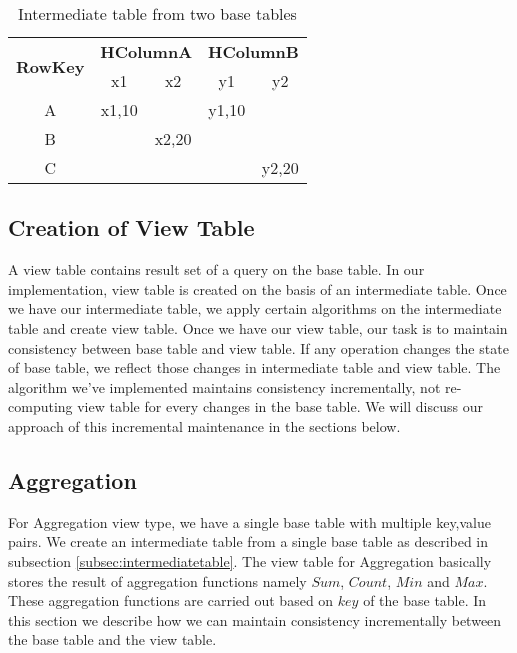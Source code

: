 \documentclass[11pt,a4paper,bibtotoc,idxtotoc,headsepline,footsepline,footexclude,BCOR12mm,DIV13]{scrbook}
\begin{document}
\begin{table*}[htb!]
	\centering
	\begin{tabular}{|c|c|c|c|c|}
		\hline
		\multirow{2}{*}{\textbf{RowKey}} & \multicolumn{2}{l|}{\textbf{HColumnA}} & \multicolumn{2}{l|}{\textbf{HColumnB}} \\ 
		\cline{2-5} 
		& x1            & x2            & y1            & y2            \\ \hline
		A                       & x1,10         &               & y1,10         &               \\ \hline
		B                       &               & x2,20         &               &               \\ \hline
		C                       &               &               &               & y2,20         \\ \hline
	\end{tabular}
	\caption{Intermediate table from two base tables}
	\label{table:Intermediate Table}
\end{table*}

\subsection{Creation of View Table}
A view table contains result set of a query on the base table. In our implementation, view table is created on the basis of an intermediate table. Once we have our intermediate table, we apply certain algorithms on the intermediate table and create view table. Once we have our view table, our task is to maintain consistency between base table and view table. If any operation changes the state of base table, we reflect those changes in intermediate table and view table. The algorithm we've implemented maintains consistency incrementally, not re-computing view table for every changes in the base table. We will discuss our approach of this incremental maintenance in the sections below.

\newpage
\subsection{Aggregation}
\label{sec:aggregationImpl}

For Aggregation view type, we have a single base table with multiple key,value pairs. We create an intermediate table from a single base table as described in subsection \ref{subsec:intermediatetable}. The view table for Aggregation basically stores the result of aggregation functions namely $Sum$, $Count$, $Min$ and $Max$. These aggregation functions are carried out based on $key$ of the base table. In this section we describe how we can maintain consistency incrementally between the base table and the view table. 
\end{document}
